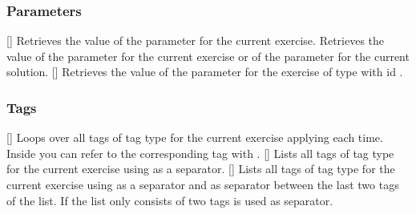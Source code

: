 \documentclass{xsim-manual}
\begin{document}
\subsubsection{Parameters}
\begin{commands}
  \expandable{}[]
    Retrieves the value of the parameter  for the current exercise.
  \expandable{}
    Retrieves the value of the parameter  for the
    current exercise or of the parameter  for the
    current solution.
  \expandable{}[]
    Retrieves the value of the parameter  for the exercise of type
     with id .
\end{commands}

\subsubsection{Tags}
\begin{commands}
  []
    Loops over all tags of tag type  for the current exercise
    applying  each time.  Inside  you can refer to the
    corresponding tag with .
  []
    Lists all tags of tag type  for the current exercise using
     as a separator.
  []
    Lists all tags of tag type  for the current exercise using
     as a separator and  as separator
    between the last two tags of the list.  If the list only consists of two
    tags  is used as separator.
\end{commands}
\end{document}
